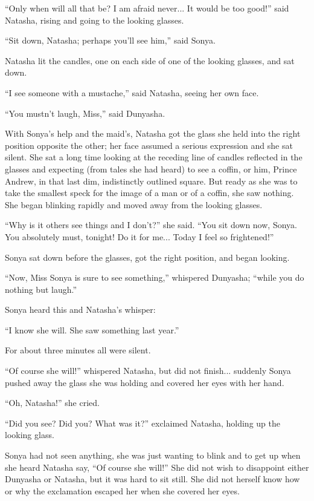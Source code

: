 ``Only when will all that be? I am afraid never... It would be
too good!'' said Natasha, rising and going to the looking
glasses.

``Sit down, Natasha; perhaps you'll see him,'' said Sonya.

Natasha lit the candles, one on each side of one of the looking
glasses, and sat down.

``I see someone with a mustache,'' said Natasha, seeing her own
face.

``You mustn't laugh, Miss,'' said Dunyasha.

With Sonya's help and the maid's, Natasha got the glass she held
into the right position opposite the other; her face assumed a
serious expression and she sat silent. She sat a long time
looking at the receding line of candles reflected in the glasses
and expecting (from tales she had heard) to see a coffin, or him,
Prince Andrew, in that last dim, indistinctly outlined
square. But ready as she was to take the smallest speck for the
image of a man or of a coffin, she saw nothing.  She began
blinking rapidly and moved away from the looking glasses.

``Why is it others see things and I don't?'' she said. ``You sit
down now, Sonya. You absolutely must, tonight! Do it for
me... Today I feel so frightened!''

Sonya sat down before the glasses, got the right position, and
began looking.

``Now, Miss Sonya is sure to see something,'' whispered Dunyasha;
``while you do nothing but laugh.''

Sonya heard this and Natasha's whisper:

``I know she will. She saw something last year.''

For about three minutes all were silent.

``Of course she will!'' whispered Natasha, but did not
finish... suddenly Sonya pushed away the glass she was holding
and covered her eyes with her hand.

``Oh, Natasha!'' she cried.

``Did you see? Did you? What was it?'' exclaimed Natasha, holding
up the looking glass.

Sonya had not seen anything, she was just wanting to blink and to
get up when she heard Natasha say, ``Of course she will!'' She
did not wish to disappoint either Dunyasha or Natasha, but it was
hard to sit still. She did not herself know how or why the
exclamation escaped her when she covered her eyes.

